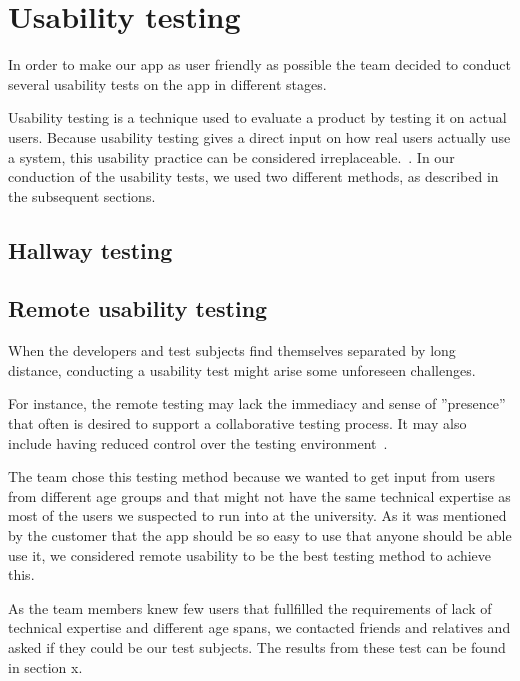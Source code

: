 \section{Usability testing}
\label{sec:userTest}
In order to make our app as user friendly as possible the team decided to conduct several usability tests on the app in different stages.

Usability testing is a technique used to evaluate a product by testing it on actual users. Because usability testing gives a direct input on how real users actually use a system, this usability practice can be considered irreplaceable.~\cite{usability}. In our conduction of the usability tests, we used two different methods, as described in the subsequent sections.



\subsection{Hallway testing}

\subsection{Remote usability testing}
When the developers and test subjects find themselves separated by long distance, conducting a usability test might arise some unforeseen challenges.

For instance, the remote testing may lack the immediacy and sense of ''presence'' that often is desired to support a collaborative testing process. It may also include having reduced control over the testing environment~\cite{remoteTest}. 

The team chose this testing method because we wanted to get input from users from different age groups and that might not have the same technical expertise as most of the users we suspected to run into at the university. As it was mentioned by the customer that the app should be so easy to use that anyone should be able use it, we considered remote usability to be the best testing method to achieve this.

As the team members knew few users that fullfilled the requirements of lack of technical expertise and different age spans, we contacted friends and relatives and asked if they could be our test subjects. The results from these test can be found in section x.

